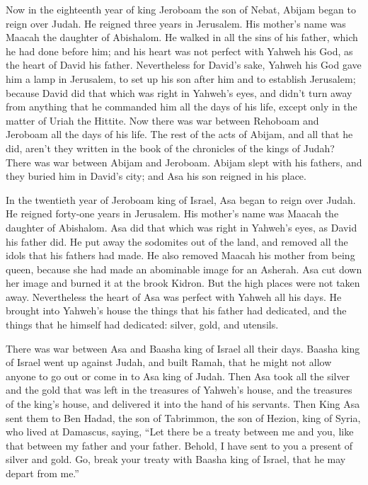  Now in the eighteenth year of king Jeroboam the son of
Nebat, Abijam began to reign over Judah.  He reigned three
years in Jerusalem. His mother's name was Maacah the daughter of
Abishalom.  He walked in all the sins of his father, which
he had done before him; and his heart was not perfect with Yahweh his
God, as the heart of David his father.  Nevertheless for
David's sake, Yahweh his God gave him a lamp in Jerusalem, to set up his
son after him and to establish Jerusalem;  because David did
that which was right in Yahweh's eyes, and didn't turn away from
anything that he commanded him all the days of his life, except only in
the matter of Uriah the Hittite.  Now there was war between
Rehoboam and Jeroboam all the days of his life.  The rest of
the acts of Abijam, and all that he did, aren't they written in the book
of the chronicles of the kings of Judah? There was war between Abijam
and Jeroboam.  Abijam slept with his fathers, and they
buried him in David's city; and Asa his son reigned in his place.

 In the twentieth year of Jeroboam king of Israel, Asa began
to reign over Judah.  He reigned forty-one years in
Jerusalem. His mother's name was Maacah the daughter of Abishalom.
 Asa did that which was right in Yahweh's eyes, as David
his father did.  He put away the sodomites out of the land,
and removed all the idols that his fathers had made.  He
also removed Maacah his mother from being queen, because she had made an
abominable image for an Asherah. Asa cut down her image and burned it at
the brook Kidron.  But the high places were not taken away.
Nevertheless the heart of Asa was perfect with Yahweh all his days.
 He brought into Yahweh's house the things that his father
had dedicated, and the things that he himself had dedicated: silver,
gold, and utensils.

 There was war between Asa and Baasha king of Israel all
their days.  Baasha king of Israel went up against Judah,
and built Ramah, that he might not allow anyone to go out or come in to
Asa king of Judah.  Then Asa took all the silver and the
gold that was left in the treasures of Yahweh's house, and the treasures
of the king's house, and delivered it into the hand of his servants.
Then King Asa sent them to Ben Hadad, the son of Tabrimmon, the son of
Hezion, king of Syria, who lived at Damascus, saying, 
``Let there be a treaty between me and you, like that between my father
and your father. Behold, I have sent to you a present of silver and
gold. Go, break your treaty with Baasha king of Israel, that he may
depart from me.''

